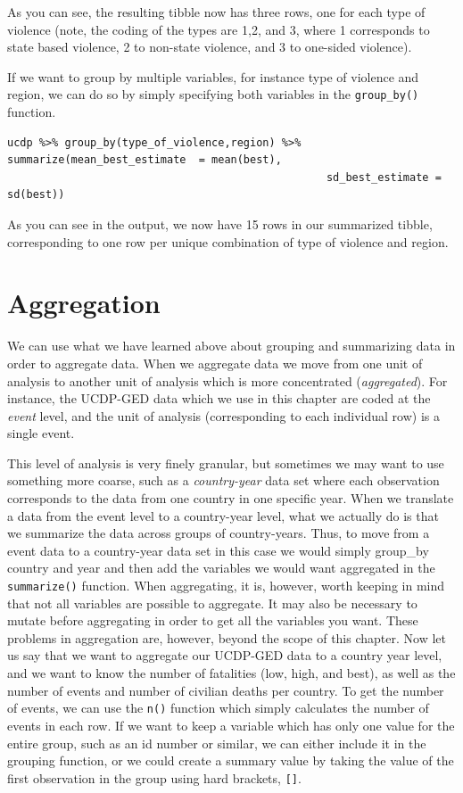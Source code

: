 \documentclass[
]{book}
\begin{document}
As you can see, the resulting tibble now has three rows, one for each type of violence (note, the coding of the types are 1,2, and 3, where 1 corresponds to state based violence, 2 to non-state violence, and 3 to one-sided violence).

If we want to group by multiple variables, for instance type of violence and region, we can do so by simply specifying both variables in the \texttt{group\_by()} function.

\begin{verbatim}
ucdp %>% group_by(type_of_violence,region) %>% summarize(mean_best_estimate  = mean(best),
                                                  sd_best_estimate = sd(best))
\end{verbatim}

As you can see in the output, we now have 15 rows in our summarized tibble, corresponding to one row per unique combination of type of violence and region.

\hypertarget{aggregation}{%
\section{Aggregation}\label{aggregation}}

We can use what we have learned above about grouping and summarizing data in order to aggregate data. When we aggregate data we move from one unit of analysis to another unit of analysis which is more concentrated (\emph{aggregated}). For instance, the UCDP-GED data which we use in this chapter are coded at the \emph{event} level, and the unit of analysis (corresponding to each individual row) is a single event.

This level of analysis is very finely granular, but sometimes we may want to use something more coarse, such as a \emph{country-year} data set where each observation corresponds to the data from one country in one specific year. When we translate a data from the event level to a country-year level, what we actually do is that we summarize the data across groups of country-years. Thus, to move from a event data to a country-year data set in this case we would simply group\_by country and year and then add the variables we would want aggregated in the \texttt{summarize()} function. When aggregating, it is, however, worth keeping in mind that not all variables are possible to aggregate. It may also be necessary to mutate before aggregating in order to get all the variables you want. These problems in aggregation are, however, beyond the scope of this chapter. Now let us say that we want to aggregate our UCDP-GED data to a country year level, and we want to know the number of fatalities (low, high, and best), as well as the number of events and number of civilian deaths per country. To get the number of events, we can use the \texttt{n()} function which simply calculates the number of events in each row. If we want to keep a variable which has only one value for the entire group, such as an id number or similar, we can either include it in the grouping function, or we could create a summary value by taking the value of the first observation in the group using hard brackets, \texttt{{[}{]}}.
\end{document}

